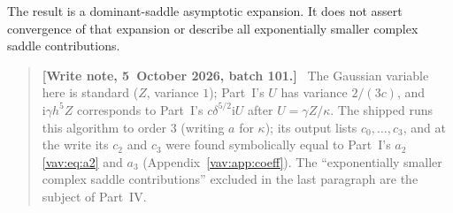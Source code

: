 \documentclass[11pt]{article}
\theoremstyle{remark}\newtheorem{remark}[theorem]{Remark}
\newcommand{\ii}{\mathrm i}
\newenvironment{writenoteb}{\begin{quote}\small\raggedright\textbf{[Write note, 5~October 2026, batch 101.]}\ }{\end{quote}}
\begin{document}
The result is a dominant-saddle asymptotic expansion. It does not assert
convergence of that expansion or describe all exponentially smaller complex
saddle contributions.
\begin{writenoteb}
The Gaussian variable here is standard ($Z$, variance $1$); Part~I's $U$
has variance $2/(3c)$, and $\ii\gamma h^5Z$ corresponds to Part~I's
$c\delta^{5/2}\ii U$ after $U=\gamma Z/\kappa$. The shipped
 runs this algorithm to order $3$
(writing $a$ for $\kappa$); its output 
lists $c_0,\ldots,c_3$, and at the write its $c_2$ and $c_3$ were found
symbolically equal to Part~I's $a_2$ \eqref{vav:eq:a2} and $a_3$
(Appendix~\ref{vav:app:coeff}). The ``exponentially smaller complex saddle
contributions'' excluded in the last paragraph are the subject of Part~IV.
\end{writenoteb}
\end{document}
